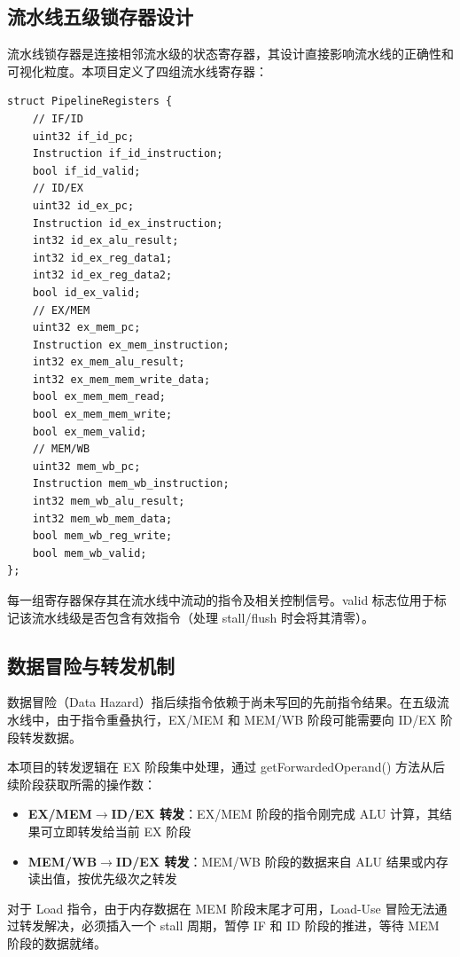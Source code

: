 \documentclass[12pt, a4paper]{article}
\begin{document}
\subsection{流水线五级锁存器设计}\label{sec:pipeline-regs}

流水线锁存器是连接相邻流水级的状态寄存器，其设计直接影响流水线的正确性和可视化粒度。本项目定义了四组流水线寄存器：

\begin{verbatim}
struct PipelineRegisters {
    // IF/ID
    uint32 if_id_pc;
    Instruction if_id_instruction;
    bool if_id_valid;
    // ID/EX
    uint32 id_ex_pc;
    Instruction id_ex_instruction;
    int32 id_ex_alu_result;
    int32 id_ex_reg_data1;
    int32 id_ex_reg_data2;
    bool id_ex_valid;
    // EX/MEM
    uint32 ex_mem_pc;
    Instruction ex_mem_instruction;
    int32 ex_mem_alu_result;
    int32 ex_mem_mem_write_data;
    bool ex_mem_mem_read;
    bool ex_mem_mem_write;
    bool ex_mem_valid;
    // MEM/WB
    uint32 mem_wb_pc;
    Instruction mem_wb_instruction;
    int32 mem_wb_alu_result;
    int32 mem_wb_mem_data;
    bool mem_wb_reg_write;
    bool mem_wb_valid;
};
\end{verbatim}

每一组寄存器保存其在流水线中流动的指令及相关控制信号。valid 标志位用于标记该流水线级是否包含有效指令（处理 stall/flush 时会将其清零）。

\subsection{数据冒险与转发机制}\label{sec:forwarding}

数据冒险（Data Hazard）指后续指令依赖于尚未写回的先前指令结果。在五级流水线中，由于指令重叠执行，EX/MEM 和 MEM/WB 阶段可能需要向 ID/EX 阶段转发数据。

本项目的转发逻辑在 EX 阶段集中处理，通过 getForwardedOperand() 方法从后续阶段获取所需的操作数：

\begin{itemize}
\item \textbf{EX/MEM$\rightarrow$ID/EX 转发}：EX/MEM 阶段的指令刚完成 ALU 计算，其结果可立即转发给当前 EX 阶段
\item \textbf{MEM/WB$\rightarrow$ID/EX 转发}：MEM/WB 阶段的数据来自 ALU 结果或内存读出值，按优先级次之转发
\end{itemize}

对于 Load 指令，由于内存数据在 MEM 阶段末尾才可用，Load-Use 冒险无法通过转发解决，必须插入一个 stall 周期，暂停 IF 和 ID 阶段的推进，等待 MEM 阶段的数据就绪。
\end{document}
